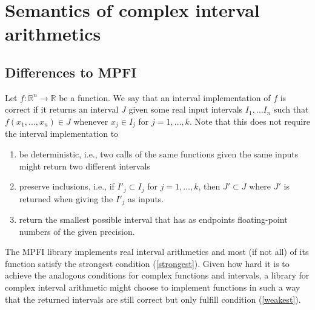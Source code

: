 \documentclass[utopia]{nmd/article}
\begin{document}
\section{Semantics of complex interval arithmetics}

\subsection{Differences to MPFI}

Let $f:\mathbb{R}^n\to \mathbb{R}$ be a function. We say that an interval implementation of $f$ is correct if it returns an interval $J$ given some real input intervals $I_1, \dots I_n$ such that $f(x_1,\dots, x_n)\in J$ whenever $x_j\in I_j$ for $j=1,\dots, k$. Note that this does not require the interval implementation to
\begin{enumerate}
\item be deterministic, i.e., two calls of the same functions given the same inputs might return two different intervals \label{weakest}
\item preserve inclusions, i.e., if $I'_j\subset I_j$ for $j=1,\dots, k$, then $J'\subset J$ where $J'$ is returned when giving the $I'_j$ as inputs. \label{inclusion}
\item return the smallest possible interval that has as endpoints floating-point numbers of the given precision. \label{strongest}
\end{enumerate}
The MPFI library implements real interval arithmetics and most (if not all) of its function satisfy the strongest condition (\ref{strongest}). Given how hard it is to achieve the analogous conditions for complex functions and intervals, a library for complex interval arithmetic might choose to implement functions in such a way that the returned intervals are still correct but only fulfill condition (\ref{weakest}).
\end{document}
